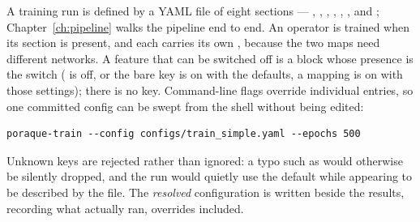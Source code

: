 A training run is defined by a YAML file of eight sections --- ,
, , , , ,
 and ; Chapter~\ref{ch:pipeline} walks the pipeline
end to end. An operator is trained when its section is present, and each
carries its own , because the two maps need different networks. A
feature that can be switched off is a block whose presence is the switch
( is off,  or the bare key is on with the defaults, a
mapping is on with those settings); there is no  key. Command-line
flags override individual entries, so one committed config can be swept from
the shell without being edited:

\begin{lstlisting}
poraque-train --config configs/train_simple.yaml --epochs 500
\end{lstlisting}

Unknown keys are rejected rather than ignored: a typo such as 
would otherwise be silently dropped, and the run would quietly use the default
while appearing to be described by the file. The \emph{resolved} configuration
is written beside the results, recording what actually ran, overrides included.
